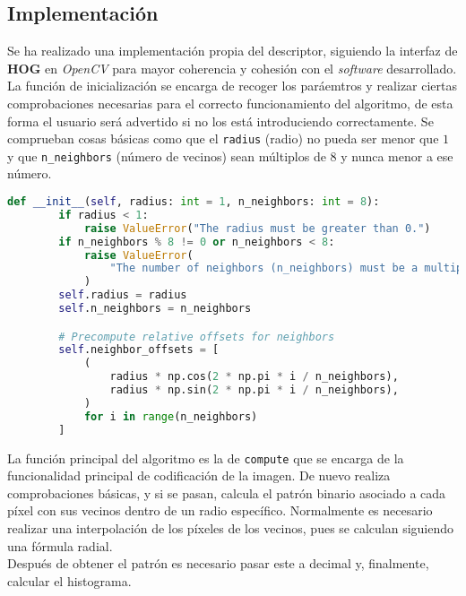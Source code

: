 \documentclass[12pt,letterpaper]{article}
\begin{document}
\subsection{Implementación}
Se ha realizado una implementación propia del descriptor, siguiendo la interfaz de \textbf{HOG} en \textit{OpenCV} para mayor coherencia y cohesión con el \textit{software} desarrollado.\\[6pt]
La función de inicialización se encarga de recoger los paráemtros y realizar ciertas comprobaciones necesarias para el correcto funcionamiento del algoritmo, de esta forma el usuario será advertido si no los está introduciendo correctamente. Se comprueban cosas básicas como que el \texttt{radius} (radio) no pueda ser menor que $1$ y que \texttt{n\_neighbors} (número de vecinos) sean múltiplos de $8$ y nunca menor a ese número.

\begin{lstlisting}[language=python]
    def __init__(self, radius: int = 1, n_neighbors: int = 8):
        if radius < 1:
            raise ValueError("The radius must be greater than 0.")
        if n_neighbors % 8 != 0 or n_neighbors < 8:
            raise ValueError(
                "The number of neighbors (n_neighbors) must be a multiple of 8 and at least 8."
            )
        self.radius = radius
        self.n_neighbors = n_neighbors

        # Precompute relative offsets for neighbors
        self.neighbor_offsets = [
            (
                radius * np.cos(2 * np.pi * i / n_neighbors),
                radius * np.sin(2 * np.pi * i / n_neighbors),
            )
            for i in range(n_neighbors)
        ]
\end{lstlisting}

La función principal del algoritmo es la de \texttt{compute} que se encarga de la funcionalidad principal de codificación de la imagen. De nuevo realiza comprobaciones básicas, y si se pasan, calcula el patrón binario asociado a cada píxel con sus vecinos dentro de un radio específico. Normalmente es necesario realizar una interpolación de los píxeles de los vecinos, pues se calculan siguiendo una fórmula radial.\\[6pt]
Después de obtener el patrón es necesario pasar este a decimal y, finalmente, calcular el histograma.
\end{document}
